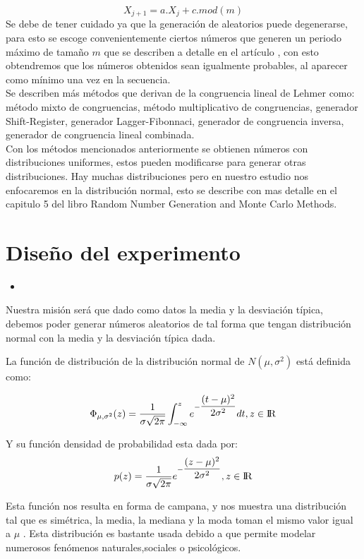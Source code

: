 \documentclass[conference,a4paper]{IEEEtran}
\begin{document}
\begin{equation}
X_{j+1} = a.X_{j}+c.mod(m)
\end{equation}
Se debe de tener cuidado ya que la generaci\'on de aleatorios puede degenerarse, para esto se escoge convenientemente ciertos n\'umeros que generen un periodo m\'aximo de tama\~no $m$ que se describen a detalle en el art\'iculo \cite{b2}, con esto obtendremos que los n\'umeros obtenidos sean igualmente probables, al aparecer como m\'inimo una vez en la secuencia.\\
Se describen m\'as m\'etodos que derivan de la congruencia lineal de Lehmer como: m\'etodo mixto de congruencias, m\'etodo multiplicativo de congruencias, generador Shift-Register, generador Lagger-Fibonnaci, generador de congruencia inversa, generador de congruencia lineal combinada.\\
Con los m\'etodos mencionados anteriormente se obtienen n\'umeros con distribuciones uniformes, estos pueden modificarse para generar otras distribuciones. Hay muchas distribuciones pero en nuestro estudio nos enfocaremos en la distribuci\'on normal, esto se describe con mas detalle en el capitulo 5 del libro Random Number Generation and Monte Carlo Methods\cite{b3}. 
  
\section{\textbf{Dise\~no del experimento}}
\begin{itemize}

\item 
\end{itemize}

Nuestra misi\'on ser\'a que dado como datos la media y la desviaci\'on t\'ipica, debemos poder generar n\'umeros aleatorios de tal forma que tengan distribuci\'on normal con la media y la desviaci\'on t\'ipica dada.

La funci\'on de distribuci\'on de la distribuci\'on normal de $N(\mu,\sigma^2)$ est\'a definida como:

$$\Phi_{\mu,\sigma^2}(z) = \dfrac {1}{\sigma\sqrt{2\pi}}
\int_{-\infty}^{z} e^{-\dfrac{(t-\mu)^2}{2\sigma^2}} dt, z \in {\rm I\!R} $$

Y su funci\'on densidad de probabilidad esta dada por:
$$p(z) = \dfrac {1}{\sigma\sqrt{2\pi}}
e^{-\dfrac{(z-\mu)^2}{2\sigma^2}} , z \in {\rm I\!R} $$

Esta funci\'on nos resulta en forma de campana, y nos muestra una distribuci\'on tal que es sim\'etrica, la media, la mediana y la moda toman el mismo valor igual a $\mu$ . Esta distribuci\'on es bastante usada debido a que permite modelar numerosos fen\'omenos naturales,sociales o psicol\'ogicos.
\end{document}
